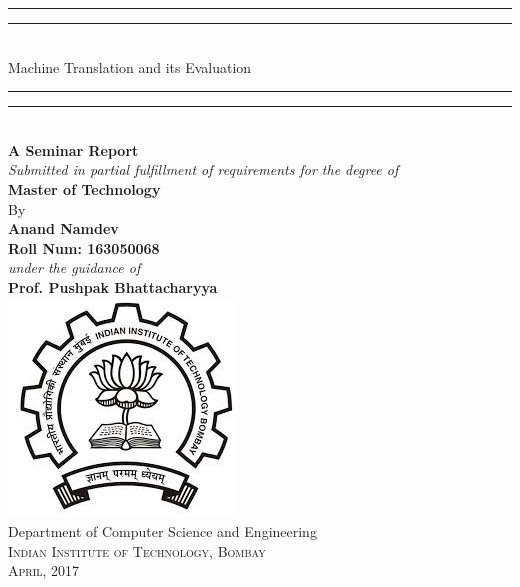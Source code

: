 \documentclass[16pt,a4paper]{report}
\begin{document}
\begin{center}
    \rule[0.5ex]{\linewidth}{2pt}\vspace*{-\baselineskip}\vspace*{3.2pt}
    \rule[0.5ex]{\linewidth}{1pt}\\[\baselineskip]
    {\LARGE Machine Translation and its Evaluation }\\[2mm]
    \rule[0.5ex]{\linewidth}{1pt}\vspace*{-\baselineskip}\vspace{3.2pt}
    \rule[0.5ex]{\linewidth}{2pt}\\
    \vspace{6.5mm}
    {\large \textbf{A Seminar Report}}\\[5pt]
    {\large \textit{Submitted in partial fulfillment of requirements for the degree of}}\\[5pt]
    {\large \textbf{Master of Technology}}\\
    \vspace{6.5mm}
    {\large By}\\
    \vspace{3mm}
    {\large\textbf{Anand Namdev}}\\
    {\large\textbf{Roll Num: 163050068}}\\
    \vspace{6.5mm}
    {\large \textit{under the guidance of }}\\[5pt]
    {\large\textbf{Prof. Pushpak Bhattacharyya}}\\
    \vspace{11mm}
    \includegraphics[scale=0.6]{Images/iitblogo.jpeg}\\
    \vspace{6mm}
    {\large Department of Computer Science and Engineering\\
    \textsc{Indian Institute of Technology, Bombay}}\\
    \vspace{11mm}
    \vspace{9mm}
    {\large\textsc{April, 2017}}
    \vspace{12mm}
\end{center}
\end{document}
